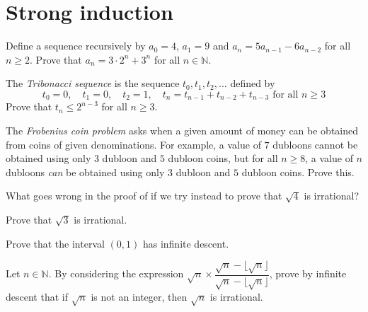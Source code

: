 \section{Strong induction}

\begin{exercise}
Define a sequence recursively by $a_0 = 4$, $a_1 = 9$ and $a_n = 5a_{n-1} - 6a_{n-2}$ for all $n \ge 2$. Prove that $a_n = 3 \cdot 2^n + 3^n$ for all $n \in \mathbb{N}$.
\end{exercise}

\begin{exercise}
The \textit{Tribonacci sequence} is the sequence $t_0, t_1, t_2, \dots$ defined by
\[ t_0 = 0, \quad t_1 = 0, \quad t_2 = 1, \quad t_n = t_{n-1} + t_{n-2} + t_{n-3} \text{ for all } n \ge 3 \]
Prove that $t_n \le 2^{n-3}$ for all $n \ge 3$.
\end{exercise}

\begin{exercise}
The \textit{Frobenius coin problem} asks when a given amount of money can be obtained from coins of given denominations. For example, a value of $7$ dubloons cannot be obtained using only $3$ dubloon and $5$ dubloon coins, but for all $n \ge 8$, a value of $n$ dubloons \textit{can} be obtained using only $3$ dubloon and $5$ dubloon coins. Prove this.
\end{exercise}


\begin{exercise}
What goes wrong in the proof of  if we try instead to prove that $\sqrt{4}$ is irrational?
\end{exercise}

\begin{exercise}
\label{exSquareRootThreeIsIrrational}
Prove that $\sqrt{3}$ is irrational.
\end{exercise}


\begin{exercise}
Prove that the interval $(0,1)$ has infinite descent.
\end{exercise}

\begin{exercise}
Let $n \in \mathbb{N}$. By considering the expression $\sqrt{n} \times \dfrac{\sqrt{n} - \lfloor \sqrt{n} \rfloor}{\sqrt{n} - \lfloor \sqrt{n} \rfloor}$, prove by infinite descent that if $\sqrt{n}$ is not an integer, then $\sqrt{n}$ is irrational.
\end{exercise}

